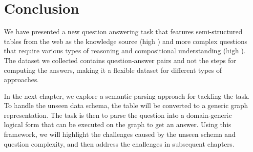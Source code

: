 \section{Conclusion}

We have presented a new question answering task
that features semi-structured tables from the web
as the knowledge source (high \Breadth)
and more complex questions that require
various types of reasoning and compositional understanding
(high \Depth).
The \wtq dataset we collected contains question-answer pairs
and not the steps for computing the answers,
making it a flexible dataset for different types of approaches.

In the next chapter,
we explore a semantic parsing approach for tackling the task.
To handle the unseen data schema,
the table will be converted to a generic graph representation.
The task is then to parse the question
into a domain-generic logical form
that can be executed on the graph to get an answer.
Using this framework,
we will highlight the challenges caused by the unseen schema
and question complexity,
and then address the challenges in subsequent chapters.
